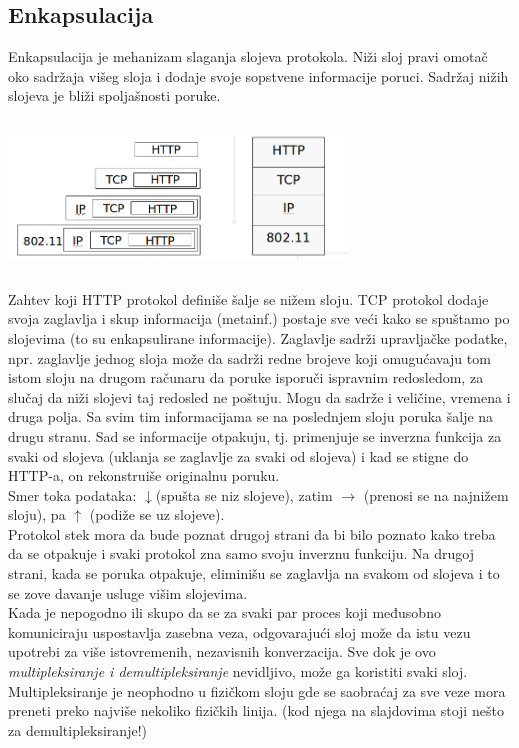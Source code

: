 \documentclass{article} %
\begin{document}
\subsection{Enkapsulacija}
Enkapsulacija je mehanizam slaganja slojeva protokola. Niži sloj pravi omotač oko sadržaja višeg sloja i dodaje svoje sopstvene informacije poruci. Sadržaj nižih slojeva je bliži spoljašnosti poruke. \\
\begin{center}
\includegraphics[width=9cm, height=4cm]{enkapsulacija}\\
\end{center}
Zahtev koji HTTP protokol definiše šalje se nižem sloju. TCP protokol dodaje svoja zaglavlja i skup informacija (metainf.) postaje sve veći kako se spuštamo po slojevima (to su enkapsulirane informacije). Zaglavlje sadrži upravljačke podatke, npr. zaglavlje jednog sloja može da sadrži redne brojeve koji omugućavaju tom istom sloju na drugom računaru da poruke isporuči ispravnim redosledom, za slučaj da niži slojevi taj redosled ne poštuju. Mogu da sadrže i veličine, vremena i druga polja. Sa svim tim informacijama se na poslednjem sloju poruka šalje na drugu stranu. Sad se informacije otpakuju, tj. primenjuje se inverzna funkcija za svaki od slojeva (uklanja se zaglavlje za svaki od slojeva) i kad se stigne do HTTP-a, on rekonstruiše originalnu poruku. \\
Smer toka podataka: $ \downarrow $(spušta se niz slojeve), zatim $ \rightarrow $
(prenosi se na najnižem sloju), pa $ \uparrow $ (podiže se uz slojeve).
\\
Protokol stek mora da bude poznat drugoj strani da bi bilo poznato kako treba da se otpakuje i svaki protokol zna samo svoju inverznu funkciju. Na drugoj strani, kada se poruka otpakuje, eliminišu se zaglavlja na svakom od slojeva i to se zove davanje usluge višim slojevima.\\
 Kada je nepogodno ili skupo da se za svaki par proces koji međusobno komuniciraju uspostavlja zasebna veza, odgovarajući sloj može da istu vezu upotrebi za više istovremenih, nezavisnih konverzacija. Sve dok je ovo \textit{multipleksiranje i demultipleksiranje} nevidljivo, može ga koristiti svaki sloj. Multipleksiranje je neophodno u fizičkom sloju gde se saobraćaj za sve veze mora preneti preko najviše nekoliko fizičkih linija. (kod njega na slajdovima stoji nešto za demultipleksiranje!)
 \\
\end{document}

